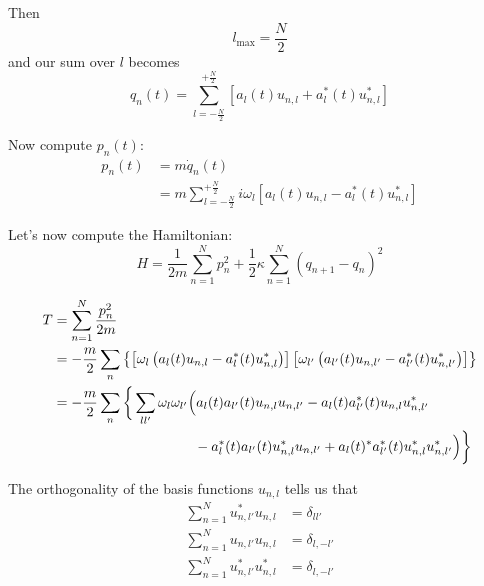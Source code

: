\documentclass{article}
\begin{document}
\noindent Then
\begin{equation*}
    l_\mathrm{max} = \dfrac{N}{2}
\end{equation*}
and our sum over $l$ becomes
\begin{equation*}
    q_n (t) = \sum_{ l = -\frac{N}{2} }^{ +\frac{N}{2} }  \left[ a_l (t) u_{n,l} + a_l^* (t) u_{n,l}^* \right]
\end{equation*}


\noindent Now compute $p_n (t)$:
\begin{align*}
    p_n (t) &= m \dot{q}_n (t) \\
    &= m \sum_{ l = -\frac{N}{2} }^{ +\frac{N}{2} } i \omega_l \left[ a_l (t) u_{n,l} - a_l^* (t) u_{n,l}^* \right]
\end{align*}

\noindent Let's now compute the Hamiltonian:
\begin{equation*}
    H = \dfrac{1}{2m} \sum_{n=1}^{N} p_n^2 + \frac{1}{2} \kappa \sum_{n=1}^{N} {\left( q_{n+1} - q_n \right)}^2
\end{equation*}

\begin{align*}
    T &= \sum_{n=1}^{N} \dfrac{p_n^2}{2m} \\
    &= - \dfrac{m}{2} \sum_n \left\lbrace \left[ \omega_l \left( a_l (t) u_{n,l} - a_l^* (t) u_{n,l}^* \right) \right] \left[ \omega_{l'} \left( a_{l'} (t) u_{n,l'} - a_{l'}^* (t) u_{n,l'}^* \right) \right] \right\rbrace \\
    &= - \dfrac{m}{2} \sum_n \bigg\lbrace \sum_{l l'} \omega_l \omega_{l'} \Big( a_l (t) a_{l'} (t) u_{n,l} u_{n,l'} - a_l (t) a_{l'}^* (t) u_{n,l} u_{n,l'}^* \\
    & \hspace{1.4in} - a_l^* (t) a_{l'} (t) u_{n,l}^* u_{n,l'} + a_l (t)^* a_{l'}^* (t) u_{n,l}^* u_{n,l'}^* \Big) \bigg\rbrace 
\end{align*}

\noindent The orthogonality of the basis functions $u_{n,l}$ tells us that
\begin{align*}
    \sum_{n=1}^{N} u_{n,l'}^* u_{n,l} &= \delta_{l l'} \\
    \sum_{n=1}^{N} u_{n,l'} u_{n,l} &= \delta_{l,-l'} \\
    \sum_{n=1}^{N} u_{n,l'}^* u_{n,l}^* &= \delta_{l,-l'}
\end{align*}

\end{document}
